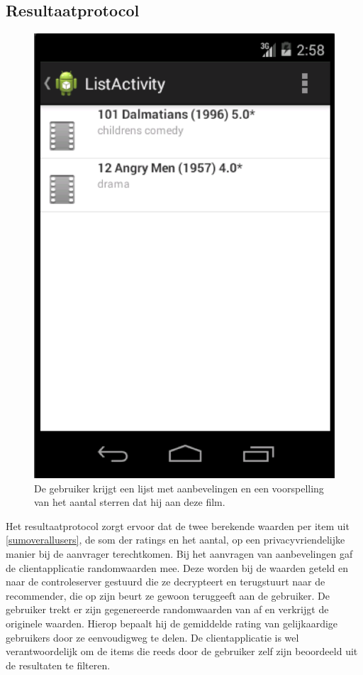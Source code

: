 \subsection{Resultaatprotocol}
\label{result}

\begin{figure}[htpb]   
    \label{Figuur::recommendations}      
  \begin{center}    
 \includegraphics[scale=0.5]{fig/recommendations}    
  \end{center}   
  \caption{De gebruiker krijgt een lijst met aanbevelingen en een voorspelling van het aantal sterren dat hij aan deze film.}  
   \end{figure}
   
Het resultaatprotocol zorgt ervoor dat de twee berekende waarden per item uit \ref{sumoverallusers}, de som der ratings en het aantal, op een privacyvriendelijke manier bij de aanvrager terechtkomen. Bij het aanvragen van aanbevelingen gaf de clientapplicatie randomwaarden mee. Deze worden bij de waarden geteld en naar de controleserver gestuurd die ze decrypteert en terugstuurt naar de recommender, die op zijn beurt ze gewoon teruggeeft aan de gebruiker. De gebruiker trekt er zijn gegenereerde randomwaarden van af en verkrijgt de originele waarden. Hierop bepaalt hij de gemiddelde rating van gelijkaardige gebruikers door ze eenvoudigweg te delen. De clientapplicatie is wel verantwoordelijk om de items die reeds door de gebruiker zelf zijn beoordeeld uit de resultaten te filteren.
